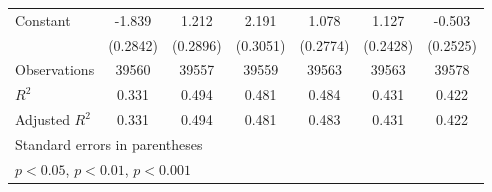 {\begin{tabular}{l*{6}{c}}
\addlinespace
Constant            &      -1.839\sym{***}&       1.212\sym{***}&       2.191\sym{***}&       1.078\sym{***}&       1.127\sym{***}&      -0.503\sym{*}  \\
                    &    (0.2842)         &    (0.2896)         &    (0.3051)         &    (0.2774)         &    (0.2428)         &    (0.2525)         \\
\midrule
Observations        &       39560         &       39557         &       39559         &       39563         &       39563         &       39578         \\
\(R^{2}\)           &       0.331         &       0.494         &       0.481         &       0.484         &       0.431         &       0.422         \\
Adjusted \(R^{2}\)  &       0.331         &       0.494         &       0.481         &       0.483         &       0.431         &       0.422         \\
\bottomrule
\multicolumn{7}{l}{\footnotesize Standard errors in parentheses}\\
\multicolumn{7}{l}{\footnotesize \sym{*} \(p<0.05\), \sym{**} \(p<0.01\), \sym{***} \(p<0.001\)}\\
\end{tabular}
}
